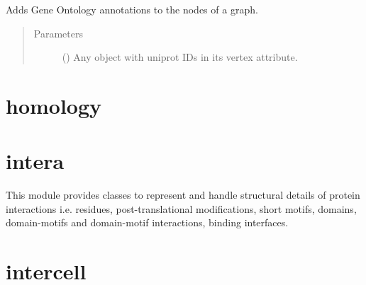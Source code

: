 \documentclass[letterpaper,10pt,english]{sphinxmanual}
\begin{document}

\begin{fulllineitems}
\label{\detokenize{reference:pypath.go.load_go}}
Adds Gene Ontology annotations to the nodes of a graph.
\begin{quote}\begin{description}
\item[{Parameters}] \leavevmode
{} () \textendash{} Any  object with uniprot IDs
in its  vertex attribute.

\end{description}\end{quote}

\end{fulllineitems}



\section{homology}
\label{\detokenize{reference:module-pypath.homology}}\label{\detokenize{reference:homology}}

\section{intera}
\label{\detokenize{reference:module-pypath.intera}}\label{\detokenize{reference:intera}}
This module provides classes to represent and handle
structural details of protein interactions
i.e. residues, post-translational modifications,
short motifs, domains, domain-motifs and
domain-motif interactions, binding interfaces.


\section{intercell}
\label{\detokenize{reference:module-pypath.intercell}}\label{\detokenize{reference:intercell}}
\end{document}
